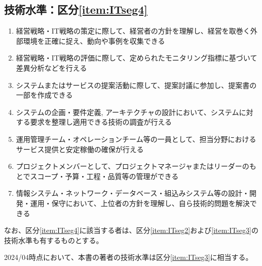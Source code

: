 \clearpage
\subsection{技術水準：区分\ref{item:ITseg4}}
\begin{enumerate}
\item {}経営戦略・IT戦略の策定に際して、経営者の方針を理解し、経営を取巻く外部環境を正確に捉え、動向や事例を収集できる
\item 経営戦略・IT戦略の評価に際して、定められたモニタリング指標に基づいて差異分析などを行える
\item システムまたはサービスの提案活動に際して、提案討議に参加し、提案書の一部を作成できる
\item システムの企画・要件定義, アーキテクチャの設計において、システムに対する要求を整理し適用できる技術の調査が行える
\item 運用管理チーム・オペレーションチーム等の一員として、担当分野におけるサービス提供と安定稼働の確保が行える
\item プロジェクトメンバーとして、プロジェクトマネージャまたはリーダーのもとでスコープ・予算・工程・品質等の管理ができる
\item {}情報システム・ネットワーク・データベース・組込みシステム等の設計・開発・運用・保守において、上位者の方針を理解し、自ら技術的問題を解決できる
\end{enumerate}
なお、区分\ref{item:ITseg4}\hx に該当する者は、区分\ref{item:ITseg2}\hx および\ref{item:ITseg3}\hx の技術水準も有するものとする。
\begin{marker}
2024/04時点において、本書の著者の技術水準は区分\ref{item:ITseg3}\hx に相当する。
\end{marker}
